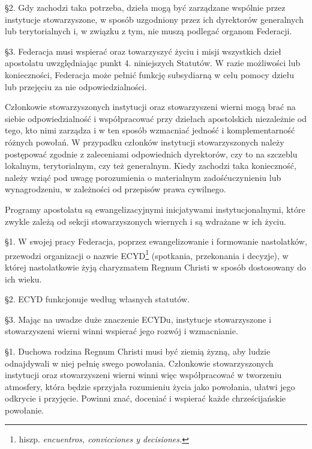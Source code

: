 \S{}2.  Gdy zachodzi taka potrzeba, dzieła mogą być zarządzane wspólnie przez instytucje stowarzyszone, w sposób uzgodniony przez ich dyrektorów generalnych lub terytorialnych i, w związku z tym, nie muszą podlegać organom Federacji.


\S{}3. Federacja musi wspierać oraz towarzyszyć życiu i misji wszystkich dzieł apostolatu uwzględniając punkt 4. niniejszych Statutów. W razie możliwości lub konieczności, Federacja może pełnić funkcję subsydiarną w celu pomocy dziełu lub przejęciu za nie odpowiedzialności.
 
 
 Członkowie stowarzyszonych instytucji oraz stowarzyszeni wierni mogą brać na siebie odpowiedzialność i współpracować przy dziełach apostolskich niezależnie od tego, kto nimi zarządza i w ten sposób wzmacniać jedność i komplementarność różnych powołań. W przypadku członków instytucji stowarzyszonych należy postępować zgodnie z zaleceniami odpowiednich dyrektorów, czy to na szczeblu lokalnym, terytorialnym, czy też generalnym. Kiedy zachodzi taka konieczność, należy wziąć pod uwagę porozumienia o materialnym zadośćuczynieniu lub wynagrodzeniu, w zależności od przepisów prawa cywilnego.
 
 
 Programy apostolatu są ewangelizacyjnymi inicjatywami instytucjonalnymi, które zwykle zależą od sekcji stowarzyszonych wiernych i są wdrażane w ich życiu.
 
 
 \S{}1. W swojej pracy Federacja, poprzez ewangelizowanie i formowanie nastolatków, przewodzi organizacji o nazwie ECYD\footnote{hiszp. {\em encuentros, convicciones y decisiones.}} (spotkania, przekonania i decyzje), w której nastolatkowie żyją charyzmatem Regnum Christi w sposób dostosowany do ich wieku.


\S{}2. ECYD funkcjonuje według własnych statutów.


\S{}3. Mając na uwadze duże znaczenie ECYDu, instytucje stowarzyszone i stowarzyszeni wierni winni wspierać jego rozwój i wzmacnianie.
 
 
 \S{}1. Duchowa rodzina Regnum Christi musi być ziemią żyzną, aby ludzie odnajdywali w niej pełnię swego powołania. Członkowie stowarzyszonych instytucji oraz stowarzyszeni wierni winni więc współpracować w tworzeniu atmosfery, która będzie sprzyjała rozumieniu życia jako powołania, ułatwi jego odkrycie i przyjęcie. Powinni  znać, doceniać i wspierać każde chrześcijańskie powołanie.


